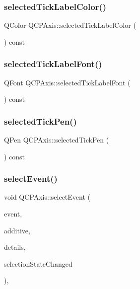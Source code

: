 \subsubsection{\texorpdfstring{selectedTickLabelColor()}{selectedTickLabelColor()}}
{\footnotesize\ttfamily Q\+Color Q\+C\+P\+Axis\+::selected\+Tick\+Label\+Color (\begin{DoxyParamCaption}{ }\end{DoxyParamCaption}) const\hspace{0.3cm}{\ttfamily [inline]}}

\mbox{\label{class_q_c_p_axis_a09817512bef8ddfb669a6828f9c855bc}} 
\subsubsection{\texorpdfstring{selectedTickLabelFont()}{selectedTickLabelFont()}}
{\footnotesize\ttfamily Q\+Font Q\+C\+P\+Axis\+::selected\+Tick\+Label\+Font (\begin{DoxyParamCaption}{ }\end{DoxyParamCaption}) const\hspace{0.3cm}{\ttfamily [inline]}}

\mbox{\label{class_q_c_p_axis_a76b52a6d824ccf9a95eb024251e1b833}} 
\subsubsection{\texorpdfstring{selectedTickPen()}{selectedTickPen()}}
{\footnotesize\ttfamily Q\+Pen Q\+C\+P\+Axis\+::selected\+Tick\+Pen (\begin{DoxyParamCaption}{ }\end{DoxyParamCaption}) const\hspace{0.3cm}{\ttfamily [inline]}}

\mbox{\label{class_q_c_p_axis_a50c3ed18e189d48421ec2978f88e4f87}} 
\subsubsection{\texorpdfstring{selectEvent()}{selectEvent()}}
{\footnotesize\ttfamily void Q\+C\+P\+Axis\+::select\+Event (\begin{DoxyParamCaption}\item[{Q\+Mouse\+Event $\ast$}]{event,  }\item[{bool}]{additive,  }\item[{const Q\+Variant \&}]{details,  }\item[{bool $\ast$}]{selection\+State\+Changed }\end{DoxyParamCaption})\hspace{0.3cm}{\ttfamily [protected]}, {\ttfamily [virtual]}}



